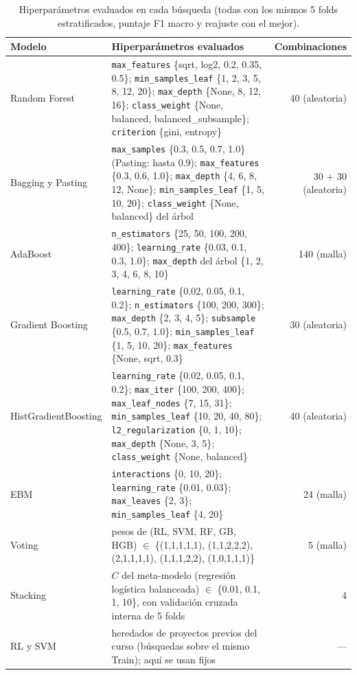\begin{table}[t]
\caption{Hiperparámetros evaluados en cada búsqueda (todas con los mismos 5 folds estratificados, puntaje F1 macro y reajuste con el mejor).}
\label{tab:espacios}
\centering\scriptsize
\setlength{\tabcolsep}{3pt}
\begin{tabular}{@{}p{2.7cm}p{12.4cm}r@{}}
\toprule
Modelo & Hiperparámetros evaluados & Combinaciones \\
\midrule
Random Forest & \texttt{max\_features} \{sqrt, log2, 0.2, 0.35, 0.5\}; \texttt{min\_samples\_leaf} \{1, 2, 3, 5, 8, 12, 20\}; \texttt{max\_depth} \{None, 8, 12, 16\}; \texttt{class\_weight} \{None, balanced, balanced\_subsample\}; \texttt{criterion} \{gini, entropy\} & 40 (aleatoria) \\
Bagging y Pasting & \texttt{max\_samples} \{0.3, 0.5, 0.7, 1.0\} (Pasting: hasta 0.9); \texttt{max\_features} \{0.3, 0.6, 1.0\}; \texttt{max\_depth} \{4, 6, 8, 12, None\}; \texttt{min\_samples\_leaf} \{1, 5, 10, 20\}; \texttt{class\_weight} \{None, balanced\} del árbol & 30 + 30 (aleatoria) \\
AdaBoost & \texttt{n\_estimators} \{25, 50, 100, 200, 400\}; \texttt{learning\_rate} \{0.03, 0.1, 0.3, 1.0\}; \texttt{max\_depth} del árbol \{1, 2, 3, 4, 6, 8, 10\} & 140 (malla) \\
Gradient Boosting & \texttt{learning\_rate} \{0.02, 0.05, 0.1, 0.2\}; \texttt{n\_estimators} \{100, 200, 300\}; \texttt{max\_depth} \{2, 3, 4, 5\}; \texttt{subsample} \{0.5, 0.7, 1.0\}; \texttt{min\_samples\_leaf} \{1, 5, 10, 20\}; \texttt{max\_features} \{None, sqrt, 0.3\} & 30 (aleatoria) \\
HistGradientBoosting & \texttt{learning\_rate} \{0.02, 0.05, 0.1, 0.2\}; \texttt{max\_iter} \{100, 200, 400\}; \texttt{max\_leaf\_nodes} \{7, 15, 31\}; \texttt{min\_samples\_leaf} \{10, 20, 40, 80\}; \texttt{l2\_regularization} \{0, 1, 10\}; \texttt{max\_depth} \{None, 3, 5\}; \texttt{class\_weight} \{None, balanced\} & 40 (aleatoria) \\
EBM & \texttt{interactions} \{0, 10, 20\}; \texttt{learning\_rate} \{0.01, 0.03\}; \texttt{max\_leaves} \{2, 3\}; \texttt{min\_samples\_leaf} \{4, 20\} & 24 (malla) \\
Voting & pesos de (RL, SVM, RF, GB, HGB) $\in$ \{(1,1,1,1,1), (1,1,2,2,2), (2,1,1,1,1), (1,1,1,2,2), (1,0,1,1,1)\} & 5 (malla) \\
Stacking & $C$ del meta-modelo (regresión logística balanceada) $\in$ \{0.01, 0.1, 1, 10\}, con validación cruzada interna de 5 folds & 4 \\
RL y SVM & heredados de proyectos previos del curso (búsquedas sobre el mismo Train); aquí se usan fijos & --- \\
\bottomrule
\end{tabular}
\end{table}
